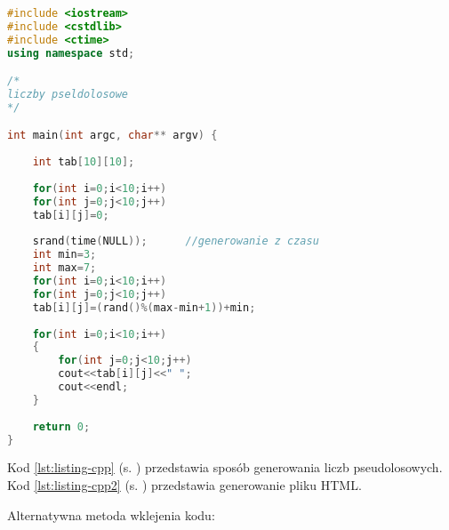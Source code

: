 \begin{lstlisting}[caption=Przykładowy kod 001, label={lst:listing-cpp}, language=C++]
#include <iostream>
#include <cstdlib>
#include <ctime>
using namespace std;

/*
liczby pseldolosowe
*/

int main(int argc, char** argv) {
	
	int tab[10][10];
	
	for(int i=0;i<10;i++)
	for(int j=0;j<10;j++)
	tab[i][j]=0;
	
	srand(time(NULL));		//generowanie z czasu
	int min=3;
	int max=7;
	for(int i=0;i<10;i++)
	for(int j=0;j<10;j++)		
	tab[i][j]=(rand()%(max-min+1))+min;	
	
	for(int i=0;i<10;i++)
	{
		for(int j=0;j<10;j++)
		cout<<tab[i][j]<<" ";	
		cout<<endl;
	}
	
	return 0;
}
\end{lstlisting}

Kod \ref{lst:listing-cpp} (s. \pageref{lst:listing-cpp}) przedstawia sposób generowania liczb pseudolosowych. Kod \ref{lst:listing-cpp2} (s. \pageref{lst:listing-cpp2}) przedstawia generowanie pliku HTML.

Alternatywna metoda wklejenia kodu:

